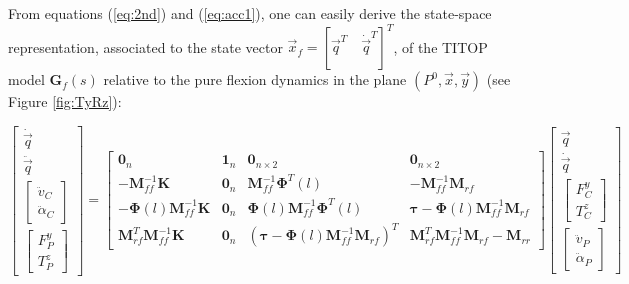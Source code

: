 \documentclass[smallcondensed]{svjour3}     %
\begin{document}
From equations (\ref{eq:2nd}) and (\ref{eq:acc1}), one can easily derive the state-space representation, associated to the state vector $\vec{x}_f=[\vec{q}^T\quad \dot{\vec{q}}^T]^T$, of the TITOP model $\mathbf{G}_{f}(s)$ relative to the pure flexion dynamics in the plane $(P^0,\vec{x},\vec{y})$ (see Figure \ref{fig:TyRz}):
\begin{small}
\begin{equation}\label{eq:Gfss}
  \left[\begin{array}{c}\dot{\vec{q}} \\ \ddot{\vec{q}} \\ \left[\begin{array}{c} \hline \ddot{v}_C\\ \ddot{\alpha}_C \end{array}\right]\\ \left[\begin{array}{c} F^y_P \\ T^z_P\end{array}\right] \end{array}\right]=\left[\begin{array}{cc|cc} \mathbf{0}_n& \mathbf{1}_n & \mathbf{0}_{n \times 2}& \mathbf{0}_{n \times 2} \\ -\mathbf{M}_{ff}^{-1}\mathbf{K} & \mathbf{0}_n & \mathbf{M}_{ff}^{-1} \mathbf{\Phi}^T(l)& -\mathbf{M}_{ff}^{-1}\mathbf{M}_{rf} \\ \hline  -\mathbf{\Phi}(l)\mathbf{M}_{ff}^{-1}\mathbf{K} & \mathbf{0}_n & \mathbf{\Phi}(l)\mathbf{M}_{ff}^{-1} \mathbf{\Phi}^T(l) & \mathbf{\tau}-\mathbf{\Phi}(l)\mathbf{M}_{ff}^{-1}\mathbf{M}_{rf}\\\mathbf{M}^T_{rf}\mathbf{M}_{ff}^{-1}\mathbf{K}  & \mathbf{0}_n & (\mathbf{\tau}-\mathbf{\Phi}(l)\mathbf{M}_{ff}^{-1}\mathbf{M}_{rf})^T & \mathbf{M}^T_{rf}\mathbf{M}_{ff}^{-1}\mathbf{M}_{rf}-\mathbf{M}_{rr} \end{array}\right]\left[\begin{array}{c}\vec{q} \\ \dot{\vec{q}} \\ \hline \left[\begin{array}{c} F^y_C \\ T^z_C \end{array}\right]\\ \left[\begin{array}{c} \ddot{v}_P\\ \ddot{\alpha}_P \end{array}\right]  \end{array}\right]
\end{equation}
\end{small}
\end{document}
